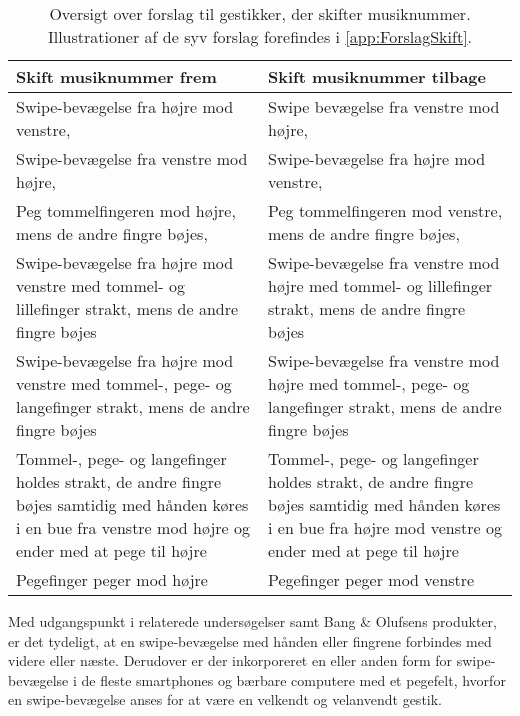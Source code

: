 \begin{table}[H]
	\centering
	\begin{tabular}{| p{6cm} | p{6cm} |}
		\hline
		\textbf{Skift musiknummer frem} & \textbf{Skift musiknummer tilbage} \\ \hline
		Swipe-bevægelse fra højre mod venstre, \parencite[s. 48]{WEB:Beosound2, WEB:BeosoundMoment, PDF:UserDefinedGesturesTV} & Swipe bevægelse fra venstre mod højre, \parencite[s. 48]{WEB:Beosound2, WEB:BeosoundMoment, PDF:UserDefinedGesturesTV} \\ \hline
		Swipe-bevægelse fra venstre mod højre, \parencite[s. 166]{PDF:ComparingInputModalities}  & Swipe-bevægelse fra højre mod venstre, \parencite[s. 166]{PDF:ComparingInputModalities}  \\ \hline
		Peg tommelfingeren mod højre, mens de andre fingre bøjes, \parencite[s. 166]{PDF:ComparingInputModalities} & Peg tommelfingeren mod venstre, mens de andre fingre bøjes, \parencite[s. 166]{PDF:ComparingInputModalities} \\ \hline
		Swipe-bevægelse fra højre mod venstre med tommel- og lillefinger strakt, mens de andre fingre bøjes & Swipe-bevægelse fra venstre mod højre med tommel- og lillefinger strakt, mens de andre fingre bøjes \\ \hline
		Swipe-bevægelse fra højre mod venstre med tommel-, pege- og langefinger strakt, mens de andre fingre bøjes & Swipe-bevægelse fra venstre mod højre med tommel-, pege- og langefinger strakt, mens de andre fingre bøjes \\ \hline
		Tommel-, pege- og langefinger holdes strakt, de andre fingre bøjes samtidig med hånden køres i en bue fra venstre mod højre og ender med at pege til højre & Tommel-, pege- og langefinger holdes strakt, de andre fingre bøjes samtidig med hånden køres i en bue fra højre mod venstre og ender med at pege til højre\\ \hline
		Pegefinger peger mod højre & Pegefinger peger mod venstre\\ \hline
	\end{tabular}
	\caption{Oversigt over forslag til gestikker, der skifter musiknummer. Illustrationer af de syv forslag forefindes i \autoref{app:ForslagSkift}.}
	\label{tab:IndsamledeGestikkerSkift}
\end{table}
\noindent
%
Med udgangspunkt i relaterede undersøgelser samt Bang $\&$ Olufsens produkter, er det tydeligt, at en swipe-bevægelse med hånden eller fingrene forbindes med videre eller næste. Derudover er der inkorporeret en eller anden form for swipe-bevægelse i de fleste smartphones og bærbare computere med et pegefelt, hvorfor en swipe-bevægelse anses for at være en velkendt og velanvendt gestik.

